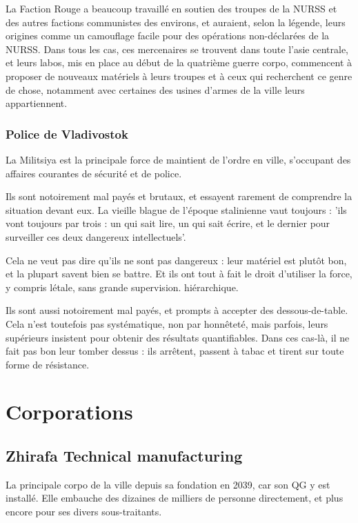 \documentclass[10pt,a4paper]{book}
\begin{document}
La Faction Rouge a beaucoup travaillé en soutien des troupes de la NURSS et des autres factions communistes des environs, et auraient, selon la légende, leurs origines comme un camouflage facile pour des opérations non-déclarées de la NURSS. Dans tous les cas, ces mercenaires se trouvent dans toute l'asie centrale, et leurs labos, mis en place au début de la quatrième guerre corpo, commencent à proposer de nouveaux matériels à leurs troupes et à ceux qui recherchent ce genre de chose, notamment avec certaines des usines d'armes de la ville leurs appartiennent.
\subsection{Police de Vladivostok}
La Militsiya est la principale force de maintient de l'ordre en ville, s'occupant des affaires courantes de sécurité et de police.

Ils sont notoirement mal payés et brutaux, et essayent rarement de comprendre la situation devant eux. La vieille blague de l'époque stalinienne vaut toujours : 'ils vont toujours par trois : un qui sait lire, un qui sait écrire, et le dernier pour surveiller ces deux dangereux intellectuels'.

Cela ne veut pas dire qu'ils ne sont pas dangereux : leur matériel est plutôt bon, et la plupart savent bien se battre. Et ils ont tout à fait le droit d'utiliser la force, y compris létale, sans grande supervision.
 hiérarchique.
 
Ils sont aussi notoirement mal payés, et prompts à accepter des dessous-de-table. Cela n'est toutefois pas systématique, non par honnêteté, mais parfois, leurs supérieurs insistent pour obtenir des résultats quantifiables. Dans ces cas-là, il ne fait pas bon leur tomber dessus : ils arrêtent, passent à tabac et tirent sur toute forme de résistance.
\chapter{Corporations}
\section{Zhirafa Technical manufacturing}
La principale corpo de la ville depuis sa fondation en 2039, car son QG y est installé. Elle embauche des dizaines de milliers de personne directement, et plus encore pour ses divers sous-traitants.
\end{document}
